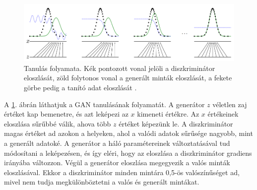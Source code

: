 

\begin{figure}[ht]
	\centering
	\includegraphics[width=1\columnwidth]{figures/gan_dist.png}
	\caption{Tanulás folyamata. Kék pontozott vonal jelöli a diszkriminátor eloszlását, zöld folytonos vonal a generált minták eloszlását, a fekete görbe pedig a tanító adat eloszlását \cite{fig:gan_dist}.}
	\label{fig:gan_dist}
\end{figure}

A \ref{fig:gan_dist}. ábrán láthatjuk a GAN tanulásának folyamatát. A generátor $z$ véletlen zaj értéket kap bemenetre, és azt leképezi az $x$ kimeneti értékre. Az $x$ értékeinek eloszlása sűrűbbé válik, ahova több $z$ értéket képezünk le. A diszkriminátor magas értéket ad azokon a helyeken, ahol a valódi adatok sűrűsége nagyobb, mint a generált adatoké. A generátor a háló paramétereinek változtatásával tud módosítani a leképezésen, és így eléri, hogy az eloszlása a diszkriminátor gradiens irányába változzon. Végül a generátor eloszlása megegyezik a valós minták eloszlásával. Ekkor a diszkriminátor minden mintára 0,5-ös valószínűséget ad, mivel nem tudja megkülönböztetni a valós és generált mintákat.


